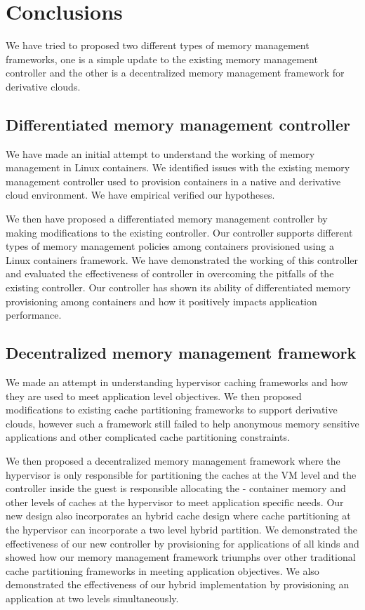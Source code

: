 
\chapter{Conclusions}

    We have tried to proposed two different types of memory management frameworks, one is a 
    simple update to the existing memory management controller and the other is a decentralized
    memory management framework for derivative clouds.
    
    \section{Differentiated memory management controller}
  
    We have made an initial attempt to understand the working of memory management in Linux
    containers. We identified issues with the existing memory management controller used to
    provision containers in a native and derivative cloud environment. We have empirical 
    verified our hypotheses. 
    
    We then have proposed a differentiated memory management 
    controller by making modifications to the existing controller. Our controller supports
    different types of memory management policies among containers provisioned using a Linux
    containers framework. We have demonstrated the working of this controller and evaluated the 
    effectiveness of controller in overcoming the pitfalls of the existing controller. 
    Our controller has shown its ability of differentiated memory provisioning among containers 
    and how it positively impacts application performance.
    
    \section{Decentralized memory management framework}
  
    We made an attempt in understanding hypervisor caching frameworks and how they are used to 
    meet application level objectives. We then proposed modifications to existing cache partitioning
    frameworks to support derivative clouds, however such a framework still failed to help anonymous 
    memory sensitive applications and other complicated cache partitioning constraints. 
    
    We then proposed a decentralized memory management framework where the hypervisor is only responsible 
    for partitioning the caches at the VM level and the controller inside the guest is responsible allocating the 
    - container memory and other levels of caches at the hypervisor to meet application specific needs. Our new design 
    also incorporates an hybrid cache design where cache partitioning at the hypervisor can incorporate a 
    two level hybrid partition. We demonstrated the effectiveness of our new controller by provisioning for
    applications of all kinds and showed how our memory management framework triumphs over other traditional 
    cache partitioning frameworks in meeting application objectives. We also demonstrated the effectiveness of
    our hybrid implementation by provisioning an application at two levels simultaneously. 
    

